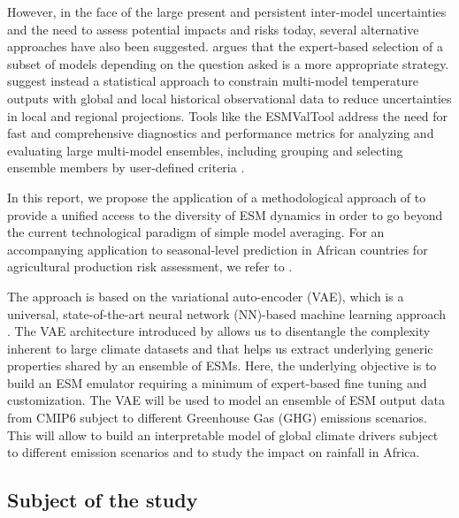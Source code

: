 \documentclass[english,a4paper,10pt]{scrartcl}
\begin{document}
However, in the face of the large present and persistent inter-model uncertainties and the need to assess potential impacts and risks today, several alternative approaches have also been suggested. \citet{Mauritzen.Zivkovic.ea.2017} argues that the expert-based selection of a subset of models depending on the question asked is a more appropriate strategy. \citet{Qasmi.Ribes.2022} suggest instead a statistical approach to constrain multi-model temperature outputs with global and local historical observational data to reduce uncertainties in local and regional projections. Tools like the ESMValTool address the need for fast and comprehensive diagnostics and performance metrics for analyzing and evaluating large multi-model ensembles, including grouping and selecting ensemble members by user-defined criteria \citep{Eyring.Bock.ea.2020.ESMvalTool}.

In this report, we propose the application of a methodological approach of \cite{Groth.Chavez.2023} to provide a unified access to the diversity of ESM dynamics in order to go beyond the current technological paradigm of simple model averaging. For an accompanying  application to seasonal-level prediction in African countries for agricultural production risk assessment, we refer to \cite{Groth.precip-predict.2023}.

The approach is based on the variational auto-encoder (VAE), which is a universal, state-of-the-art neural network (NN)-based machine learning approach \citep{Kingma.Welling.2014}. The VAE architecture introduced by \cite{Groth.Chavez.2023} allows us to disentangle the complexity inherent to large climate datasets and that helps us extract underlying generic properties shared by an ensemble of ESMs. Here, the underlying objective is to build an ESM emulator requiring a minimum of expert-based fine tuning and customization.  The VAE will be used to model an ensemble of ESM output data from CMIP6 subject to different Greenhouse Gas (GHG) emissions scenarios. This will allow to build an interpretable model of global climate drivers subject to different emission scenarios and to study the impact on rainfall in Africa.

\subsection{Subject of the study}
\end{document}

